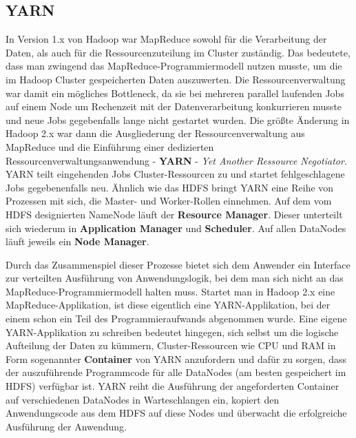 \subsection{YARN}
\label{chap:fund sec:core sub:yarn}
In Version 1.x von Hadoop war MapReduce sowohl für die Verarbeitung der Daten, als auch für die Ressourcenzuteilung im Cluster zuständig. Das bedeutete, dass man zwingend das MapReduce-Programmiermodell nutzen musste, um die im Hadoop Cluster gespeicherten Daten auszuwerten. Die Ressourcenverwaltung war damit ein mögliches Bottleneck, da sie bei mehreren parallel laufenden Jobs auf einem Node um Rechenzeit mit der Datenverarbeitung konkurrieren musste und neue Jobs gegebenfalls lange nicht gestartet wurden.\cite{freiknecht_big_2018}
Die größte Änderung in Hadoop 2.x war dann die Ausgliederung der Ressourcenverwaltung aus MapReduce und die Einführung einer dedizierten Ressourcenverwaltungsanwendung - \textbf{YARN} - \textit{Yet Another Ressource Negotiator}. YARN teilt eingehenden Jobs Cluster-Ressourcen zu und startet fehlgeschlagene Jobs gegebenenfalls neu. Ähnlich wie das HDFS bringt YARN eine Reihe von Prozessen mit sich, die Master- und Worker-Rollen einnehmen. Auf dem vom HDFS designierten NameNode läuft der \textbf{Resource Manager}. Dieser unterteilt sich wiederum in \textbf{Application Manager} und \textbf{Scheduler}. Auf allen DataNodes läuft jeweils ein \textbf{Node Manager}.\cite{freiknecht_big_2018} 
\par
Durch das Zusammenspiel dieser Prozesse bietet sich dem Anwender ein Interface zur verteilten Ausführung von Anwendungslogik, bei dem man sich nicht an das MapReduce-Programmiermodell halten muss. Startet man in Hadoop 2.x eine MapReduce-Applikation, ist diese eigentlich eine YARN-Applikation, bei der einem schon ein Teil des Programmieraufwands abgenommen wurde. Eine eigene YARN-Applikation zu schreiben bedeutet hingegen, sich selbst um die logische Aufteilung der Daten zu kümmern, Cluster-Ressourcen wie CPU und RAM in Form sogenannter \textbf{Container} von YARN anzufordern und dafür zu sorgen, dass der auszuführende Programmcode für alle DataNodes (am besten gespeichert im HDFS) verfügbar ist. YARN reiht die Ausführung der angeforderten Container auf verschiedenen DataNodes in Warteschlangen ein, kopiert den Anwendungscode aus dem HDFS auf diese Nodes und überwacht die erfolgreiche Ausführung der Anwendung. 
  
